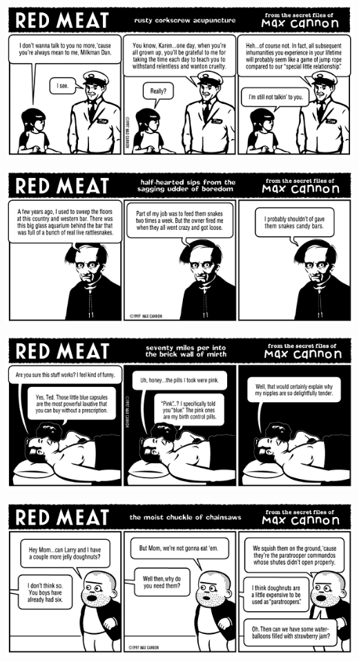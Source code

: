 \documentclass[a4paper,twoside,11pt]{article}
\begin{document}
\includegraphics[width=\textwidth]{redmeat_1997-06-09.png}



\includegraphics[width=\textwidth]{redmeat_1997-06-16.png}



\includegraphics[width=\textwidth]{redmeat_1997-06-23.png}



\includegraphics[width=\textwidth]{redmeat_1997-06-30.png}
\end{document}
